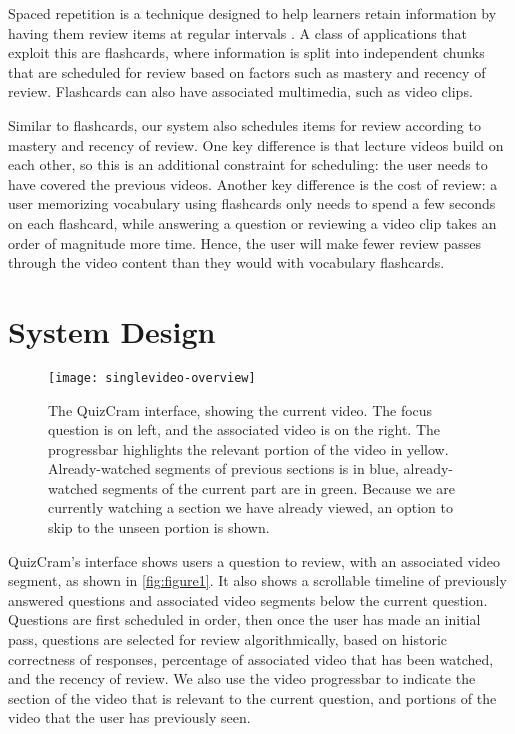 \documentclass{chi-ext}
\begin{document}
Spaced repetition is a technique designed to help learners retain information by having them review  items at regular intervals \cite{karpicke2011spaced}. A class of applications that exploit this are flashcards, where information is split into independent chunks that are scheduled for review based on factors such as mastery and recency of review. Flashcards can also have associated multimedia, such as video clips.

Similar to flashcards, our system also schedules items for review according to mastery and recency of review. One key difference is that lecture videos build on each other, so this is an additional constraint for scheduling: the user needs to have covered the previous videos. Another key difference is the cost of review: a user memorizing vocabulary using flashcards only needs to spend a few seconds on each flashcard, while answering a question or reviewing a video clip takes an order of magnitude more time. Hence, the user will make fewer review passes through the video content than they would with vocabulary flashcards.
\section{System Design}
\begin{figure}
\centering
\texttt{[image: singlevideo-overview]}
\caption{The QuizCram interface, showing the current video. The focus question is on left, and the associated video is on the right. The progressbar highlights the relevant portion of the video in yellow. Already-watched segments of previous sections is in blue, already-watched segments of the current part are in green. Because we are currently watching a section we have already viewed, an option to skip to the unseen portion is shown.}
\label{fig:figure1}
\end{figure}

QuizCram's interface shows users a question to review, with an associated video segment, as shown in \autoref{fig:figure1}. It also shows a scrollable timeline of previously answered questions and associated video segments below the current question. Questions are first scheduled in order, then once the user has made an initial pass, questions are selected for review algorithmically, based on historic correctness of responses, percentage of associated video that has been watched, and the recency of review. We also use the video progressbar to indicate the section of the video that is relevant to the current question, and portions of the video that the user has previously seen.
\end{document}
